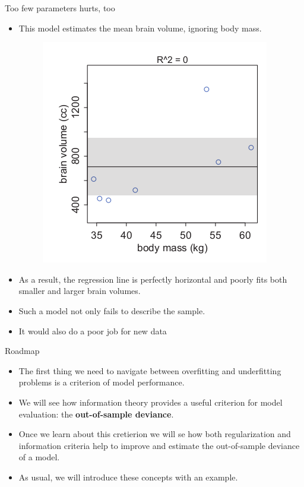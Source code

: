 \documentclass[handout]{beamer}
\begin{document}
\begin{frame}[fragile]{Too few parameters hurts, too}
\scriptsize{

\begin{itemize}


\item This model estimates the mean brain volume, ignoring body mass.


\begin{figure}[h!]
	\centering
	\includegraphics[scale=0.41]{pics/regconstant.png}
\end{figure}

\item As a result, the regression line is perfectly horizontal and poorly fits both smaller and larger brain volumes.

\item Such a model not only fails to describe the sample.

\item It would also do a poor job for new data

\end{itemize}


} 
\end{frame}


\begin{frame}{Roadmap}
\scriptsize{

\begin{itemize}
\item The first thing we need to navigate between overfitting and underfitting problems is a criterion of model performance.

\item We will see how information theory provides a useful criterion for model evaluation: the \textbf{out-of-sample deviance}.

\item Once we learn about this cretierion we will se how both regularization and information criteria help to improve and estimate the out-of-sample deviance of a model.

\item As usual, we will introduce these concepts with an example.

\end{itemize}


} 
\end{frame}
\end{document}
